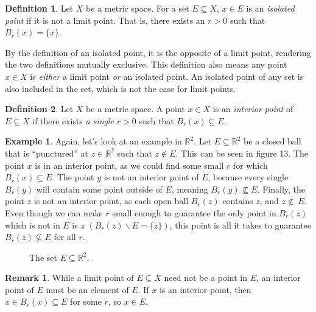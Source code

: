 \documentclass{article}
\newcommand{\R}{\mathbb{R}}
\theoremstyle{definition}
\newtheorem{definition}{Definition}[section]
\newtheorem{example}{Example}[section]
\newtheorem{remark}{Remark}[section]
\begin{document}
	\begin{definition}\label{def2.7}
		Let $ X $ be a metric space. For a set $ E\subseteq X $, $ x\in E $ is an \textit{\color{red}isolated point} if it is not a limit point. That is, there exists an $ r>0 $ such that $ B_r(x)=\{x\} $. 
	\end{definition}
	By the definition of an isolated point, it is the opposite of a limit point, rendering the two definitions mutually exclusive. This definition also means any point $ x\in X $ is \textit{either} a limit point \textit{or} an isolated point.  An isolated point of any set is also included in the set, which is not the case for limit points. 
	\begin{definition}\label{def2.8}
		Let $ X $ be a metric space. A point $ x\in X$ is an \textit{\color{red}interior point} of $ E\subseteq X $ if there exists \textit{a single} $ r>0 $ such that $ B_r(x)\subseteq E $. 
	\end{definition}
	\begin{example}
		Again, let's look at an example in $ \R^2 $. Let $ E\subseteq \R^2 $ be a closed ball that is ``punctured'' at $ z\in\R^2 $ such that $ z\notin E$. This can be seen in figure 13. The point $ x $ is in an interior point, as we could find some small $ r $ for which $ B_r(x)\subseteq E $. The point $ y $ is not an interior point of $ E $, because every single $ B_r(y) $ will contain some point outside of $ E $, meaning $ B_r(y)\not\subseteq E $. Finally, the point $ z $ is not an interior point, as each open ball $ B_r(z) $ contains $ z $, and $ z\notin\ E $. Even though we can make $ r $ small enough to guarantee the only point in $ B_r(z) $ which is not in $ E $ is $ z $ $ (B_r(z)\backslash E=\{z\}) $, this point is all it takes to guarantee $ B_r(z)\not\subseteq E $ for all $ r $. 
		\begin{figure}[h]
			\centering
			\caption{The set $ E\subseteq \R^2 $.}
		\end{figure}	
	\end{example}
	\begin{remark}
		While a limit point of $ E\subseteq X $ need not be a point in $ E $, an interior point of $ E $ must be an element of $ E $. If $ x $ is an interior point, then $ x\in B_r(x)\subseteq E $ for some $ r $, so $ x\in E $. 
	\end{remark}
\end{document}
